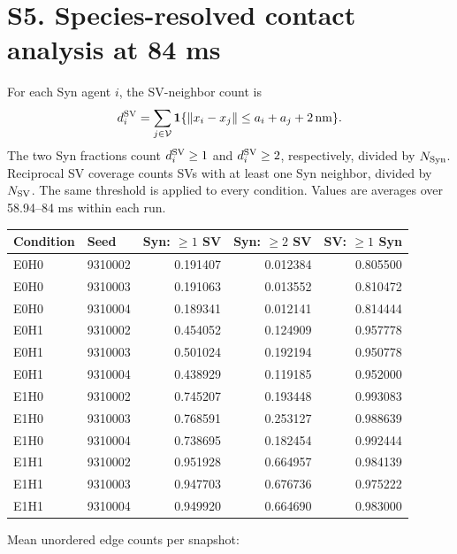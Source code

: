 \documentclass[11pt,letterpaper]{article}
\begin{document}
\section*{S5. Species-resolved contact analysis at 84 ms}
For each Syn agent $i$, the SV-neighbor count is
\[
d_i^{\rm SV}=\sum_{j\in\mathcal V}\mathbf1\{\|x_i-x_j\|\leq a_i+a_j+2\,\mathrm{nm}\}.
\]
The two Syn fractions count $d_i^{\rm SV}\geq1$ and $d_i^{\rm SV}\geq2$,
respectively, divided by $N_{\rm Syn}$. Reciprocal SV coverage counts
SVs with at least one Syn neighbor, divided by $N_{\rm SV}$.
The same threshold is applied to every condition. Values are averages
over 58.94--84 ms within each run.
\begin{center}\small
\begin{tabular}{llrrr}
\toprule
Condition & Seed & Syn: $\geq1$ SV & Syn: $\geq2$ SV & SV: $\geq1$ Syn \\ \midrule
E0H0 & 9310002 & 0.191407 & 0.012384 & 0.805500 \\
E0H0 & 9310003 & 0.191063 & 0.013552 & 0.810472 \\
E0H0 & 9310004 & 0.189341 & 0.012141 & 0.814444 \\
E0H1 & 9310002 & 0.454052 & 0.124909 & 0.957778 \\
E0H1 & 9310003 & 0.501024 & 0.192194 & 0.950778 \\
E0H1 & 9310004 & 0.438929 & 0.119185 & 0.952000 \\
E1H0 & 9310002 & 0.745207 & 0.193448 & 0.993083 \\
E1H0 & 9310003 & 0.768591 & 0.253127 & 0.988639 \\
E1H0 & 9310004 & 0.738695 & 0.182454 & 0.992444 \\
E1H1 & 9310002 & 0.951928 & 0.664957 & 0.984139 \\
E1H1 & 9310003 & 0.947703 & 0.676736 & 0.975222 \\
E1H1 & 9310004 & 0.949920 & 0.664690 & 0.983000 \\
\bottomrule\end{tabular}\end{center}
Mean unordered edge counts per snapshot:
\end{document}
